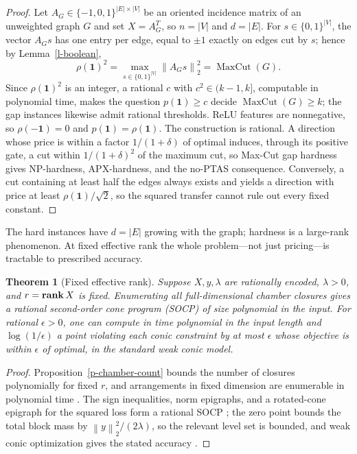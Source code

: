 \documentclass[12pt]{article}
\theoremstyle{plain}
\newtheorem{theorem}{Theorem}
\theoremstyle{definition}
\newcommand{\norm}[1]{\left\lVert #1\right\rVert}
\newcommand{\ones}{\mathbf{1}}
\newcommand{\rank}{\mathop{\bf rank}}
\begin{document}
\begin{proof}
Let $A_G\in\{-1,0,1\}^{|E|\times|V|}$ be an oriented incidence matrix of an
unweighted graph $G$ and set $X=A_G^T$, so $n=|V|$ and $d=|E|$. For
$s\in\{0,1\}^{|V|}$, the vector $A_Gs$ has one entry per edge, equal to $\pm1$
exactly on edges cut by $s$; hence by Lemma~\ref{l-boolean},
\[
  \rho(\ones)^2=\max_{s\in\{0,1\}^{|V|}}\norm{A_Gs}_2^2
  =\operatorname{MaxCut}(G).
\]
Since $\rho(\ones)^2$ is an integer, a rational $c$ with $c^2\in(k-1,k]$,
computable in polynomial time, makes the question $p(\ones)\ge c$ decide
$\operatorname{MaxCut}(G)\ge k$; the gap instances likewise admit rational
thresholds.
ReLU features are nonnegative, so $\rho(-\ones)=0$ and
$p(\ones)=\rho(\ones)$. The construction is rational. A direction whose price
is within a factor $1/(1+\delta)$ of optimal induces, through its positive
gate, a cut within $1/(1+\delta)^2$ of the maximum cut, so Max-Cut gap
hardness \citep[Theorem~8.2]{hastad2001optimal} gives NP-hardness,
APX-hardness, and the no-PTAS consequence. Conversely, a cut containing at
least half the edges always exists and yields a direction with price at least
$\rho(\ones)/\sqrt2$, so the squared transfer cannot rule out every fixed
constant.
\end{proof}

The hard instances have $d=|E|$ growing with the graph; hardness is a
large-rank phenomenon. At fixed effective rank the whole problem---not just
pricing---is tractable to prescribed accuracy.

\begin{theorem}[Fixed effective rank]\label{t-fixed-rank}
Suppose $X,y,\lambda$ are rationally encoded, $\lambda>0$, and $r=\rank X$ is
fixed. Enumerating all full-dimensional chamber closures gives a rational
second-order cone program (SOCP) of size polynomial in the input. For
rational $\epsilon>0$, one can compute in time polynomial in the input length
and $\log(1/\epsilon)$ a point violating each conic constraint by at most
$\epsilon$ whose objective is within $\epsilon$ of optimal, in the standard
weak conic model.
\end{theorem}

\begin{proof}
Proposition~\ref{p-chamber-count} bounds the number of closures polynomially
for fixed $r$, and arrangements in fixed dimension are enumerable in
polynomial time \citep{edelsbrunner1986constructing}. The sign inequalities,
norm epigraphs, and a rotated-cone epigraph for the squared loss form a
rational SOCP \citep[\S4.4.2]{boyd2004convex}; the zero point bounds the total
block mass by $\norm y_2^2/(2\lambda)$, so the relevant level set is bounded,
and weak conic optimization gives the stated accuracy
\citep[Chapters~4 and~6]{nesterov1994interior}.
\end{proof}
\end{document}
